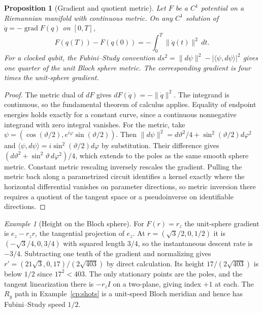 \documentclass[aps,pra,onecolumn,superscriptaddress,nofootinbib,10pt]{revtex4-2}
\newtheorem{proposition}[theorem]{Proposition}
\theoremstyle{definition}
\theoremstyle{remark}
\newtheorem{example}[theorem]{Example}
\begin{document}
\begin{proposition}[Gradient and quotient metric]\label{cp:grad}
Let $F$ be a $C^1$ potential on a Riemannian manifold with continuous metric. On any $C^1$ solution of $\dot q=-\operatorname{grad}F(q)$ on $[0,T]$,
\[
 F(q(T))-F(q(0))=-\int_0^T\|\dot q(t)\|^2\,dt.
\]
For a clocked qubit, the Fubini--Study convention $ds^2=\|d\psi\|^2-|\langle\psi,d\psi\rangle|^2$ gives one quarter of the unit Bloch sphere metric. The corresponding gradient is four times the unit-sphere gradient. \cite{n5-qng}
\end{proposition}
\begin{proof}
The metric dual of $dF$ gives $dF(\dot q)=-\|\dot q\|^2$. The integrand is continuous, so the fundamental theorem of calculus applies. Equality of endpoint energies holds exactly for a constant curve, since a continuous nonnegative integrand with zero integral vanishes. For the metric, take $\psi=(\cos(\vartheta/2),e^{i\varphi}\sin(\vartheta/2))$. Then
$\|d\psi\|^2=d\vartheta^2/4+\sin^2(\vartheta/2)d\varphi^2$ and $\langle\psi,d\psi\rangle=i\sin^2(\vartheta/2)d\varphi$ by substitution. Their difference gives $(d\vartheta^2+\sin^2\vartheta\,d\varphi^2)/4$, which extends to the poles as the same smooth sphere metric. Constant metric rescaling inversely rescales the gradient. Pulling the metric back along a parametrized circuit identifies a kernel exactly where the horizontal differential vanishes on parameter directions, so metric inversion there requires a quotient of the tangent space or a pseudoinverse on identifiable directions.
\end{proof}

\begin{example}[Height on the Bloch sphere]\label{cp:height}
For $F(r)=r_z$ the unit-sphere gradient is $e_z-r_zr$, the tangential projection of $e_z$. At $r=(\sqrt3/2,0,1/2)$ it is $(-\sqrt3/4,0,3/4)$ with squared length $3/4$, so the instantaneous descent rate is $-3/4$. Subtracting one tenth of the gradient and normalizing gives
$r'=(21\sqrt3,0,17)/(2\sqrt{403})$ by direct calculation. Its height $17/(2\sqrt{403})$ is below $1/2$ since $17^2<403$. The only stationary points are the poles, and the tangent linearization there is $-r_z I$ on a two-plane, giving index $+1$ at each. The $R_y$ path in Example~\ref{cp:shots} is a unit-speed Bloch meridian and hence has Fubini--Study speed $1/2$.
\end{example}
\end{document}
